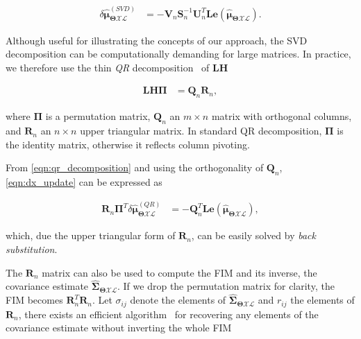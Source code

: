 \begin{equation}\label{eqn:dx_svd_solve}
  \begin{aligned}
  \delta\hat{\boldsymbol{\mu}}_{\boldsymbol{\Theta}\mathcal{X}\mathcal{L}}^
    {(SVD)} &=
    -\mathbf{V}_n\mathbf{S}_n^{-1}\mathbf{U}_n^T\mathbf{L}
    \mathbf{e}(
    \mathbf{\hat{\boldsymbol{\mu}}_{
    \boldsymbol{\Theta}\mathcal{X}\mathcal{L}}}).
  \end{aligned}
\end{equation}

Although useful for illustrating the concepts of our approach, the SVD
decomposition can be computationally demanding for large matrices. In practice,
we therefore use the thin \emph{QR} decomposition~\cite{golub96matrix} of
$\mathbf{L}\mathbf{H}$

\begin{equation}\label{eqn:qr_decomposition}
  \begin{aligned}
  \mathbf{L}\mathbf{H}\boldsymbol{\Pi} &= \mathbf{Q}_n\mathbf{R}_n,
  \end{aligned}
\end{equation}

\noindent where $\boldsymbol{\Pi}$ is a permutation matrix, $\mathbf{Q}_n$ an
$m\times n$ matrix with orthogonal columns, and $\mathbf{R}_n$ an $n\times n$
upper triangular matrix. In standard QR decomposition, $\boldsymbol{\Pi}$ is
the identity matrix, otherwise it reflects column pivoting.

From \eqref{eqn:qr_decomposition} and using the orthogonality of $\mathbf{Q}_n$,
\eqref{eqn:dx_update} can be expressed as

\begin{equation}\label{eqn:dx_qr_solve}
  \begin{aligned}
  \mathbf{R}_n\boldsymbol{\Pi}^{T}
    \delta\hat{\boldsymbol{\mu}}_{\boldsymbol{\Theta}\mathcal{X}\mathcal{L}}^
    {(QR)}&=
    -\mathbf{Q}_n^T \mathbf{L}\mathbf{e}(
    \mathbf{\hat{\boldsymbol{\mu}}_{
    \boldsymbol{\Theta}\mathcal{X}\mathcal{L}}}),
  \end{aligned}
\end{equation}

\noindent which, due the upper triangular form of $\mathbf{R}_n$, can be easily
solved by \emph{back substitution}.

The $\mathbf{R}_n$ matrix can also be used to compute the FIM and its
inverse, the covariance estimate
$\hat{\boldsymbol{\Sigma}}_{\boldsymbol{\Theta}\mathcal{X}\mathcal{L}}$. If we
drop the permutation matrix for clarity, the FIM becomes
$\mathbf{R}_n^T\mathbf{R}_n$. Let $\sigma_{ij}$ denote the elements of
$\hat{\boldsymbol{\Sigma}}_{\boldsymbol{\Theta}\mathcal{X}\mathcal{L}}$ and
$r_{ij}$ the elements of $\mathbf{R}_n$, there exists an
efficient algorithm~\cite{kaess09covariance} for recovering any elements of the
covariance estimate without inverting the whole FIM

